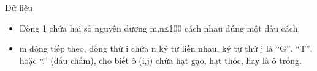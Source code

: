 Dữ liệu
\begin{itemize}
	\item     Dòng 1 chứa hai số nguyên dương m,n≤100 cách nhau đúng một dấu cách.   
	\item     m dòng tiếp theo, dòng thứ i chứa n ký tự liền nhau, ký tự thứ j là “G”, “T”, hoặc “.” (dấu chấm), cho biết ô (i,j) chứa hạt gạo, hạt thóc, hay là ô trống.   
\end{itemize}